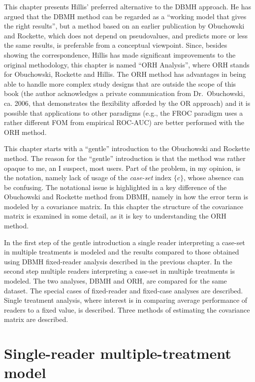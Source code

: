 \documentclass[
]{book}
\begin{document}
This chapter presents Hillis' preferred alternative to the DBMH approach. He has argued that the DBMH method can be regarded as a ``working model that gives the right results'', but a method based on an earlier publication \citep{RN1450} by Obuchowski and Rockette, which does not depend on pseudovalues, and predicts more or less the same results, is preferable from a conceptual viewpoint. Since, besides showing the correspondence, Hillis has made significant improvements to the original methodology, this chapter is named ``ORH Analysis'', where ORH stands for Obuchowski, Rockette and Hillis. The ORH method has advantages in being able to handle more complex study designs \citep{RN2508} that are outside the scope of this book (the author acknowledges a private communication from Dr.~Obuchowski, ca. 2006, that demonstrates the flexibility afforded by the OR approach) and it is possible that applications to other paradigms (e.g., the FROC paradigm uses a rather different FOM from empirical ROC-AUC) are better performed with the ORH method.

This chapter starts with a ``gentle'' introduction to the Obuchowski and Rockette method. The reason for the ``gentle'' introduction is that the method was rather opaque to me, an I suspect, most users. Part of the problem, in my opinion, is the notation, namely lack of usage of the \emph{case-set} index \(\{c\}\), whose absence can be confusing. The notational issue is highlighted in a key difference of the Obuchowski and Rockette method from DBMH, namely in how the error term is modeled by a covariance matrix. In this chapter the structure of the covariance matrix is examined in some detail, as it is key to understanding the ORH method.

In the first step of the gentle introduction a single reader interpreting a case-set in multiple treatments is modeled and the results compared to those obtained using DBMH fixed-reader analysis described in the previous chapter. In the second step multiple readers interpreting a case-set in multiple treatments is modeled. The two analyses, DBMH and ORH, are compared for the same dataset. The special cases of fixed-reader and fixed-case analyses are described. Single treatment analysis, where interest is in comparing average performance of readers to a fixed value, is described. Three methods of estimating the covariance matrix are described.

\hypertarget{OR1RMTModel}{%
\section{Single-reader multiple-treatment model}\label{OR1RMTModel}}
\end{document}
